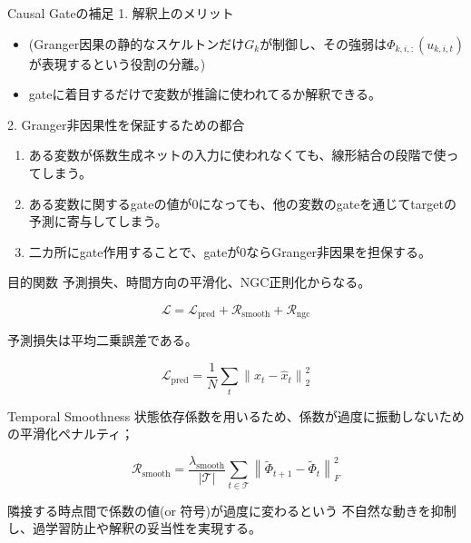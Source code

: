 \documentclass[dvipdfmx,11pt]{beamer}
\begin{document}
\begin{frame}{Causal Gateの補足}
1. 解釈上のメリット
\begin{itemize}
  \item (Granger因果の静的なスケルトンだけ$G_k$が制御し、その強弱は$\Phi_{k,i,:}(u_{k,i,t})$が表現するという役割の分離。)
  \item gateに着目するだけで変数が推論に使われてるか解釈できる。
\end{itemize}

2. Granger非因果性を保証するための都合
\begin{enumerate}
  \item ある変数が係数生成ネットの入力に使われなくても、線形結合の段階で使ってしまう。
  \item ある変数に関するgateの値が0になっても、他の変数のgateを通じてtargetの予測に寄与してしまう。
  \item 二カ所にgate作用することで、gateが0ならGranger非因果を担保する。
\end{enumerate}

\end{frame}




\begin{frame}{目的関数}
  予測損失、時間方向の平滑化、NGC正則化からなる。

  \[
    \mathcal{L}
    =
    \mathcal{L}_{\mathrm{pred}}
    +
    \mathcal{R}_{\mathrm{smooth}}
    +
    \mathcal{R}_{\mathrm{ngc}}
  \]

  \vspace{0.3em}

  予測損失は平均二乗誤差である。

  \[
    \mathcal{L}_{\mathrm{pred}}
    =
    \frac{1}{N}
    \sum_t
    \left\|
      x_t - \hat{x}_t
    \right\|_2^2
  \]

\end{frame}


\begin{frame}{Temporal Smoothness}
  状態依存係数を用いるため、係数が過度に振動しないための平滑化ペナルティ；

  \[
    \mathcal{R}_{\mathrm{smooth}}
    =
    \frac{\lambda_{\mathrm{smooth}}}{|\mathcal{T}|}
    \sum_{t \in \mathcal{T}}
    \left\|
      \tilde{\Phi}_{t+1}
      -
      \tilde{\Phi}_t
    \right\|_F^2
  \]

 隣接する時点間で係数の値(or 符号)が過度に変わるという
 不自然な動きを抑制し、過学習防止や解釈の妥当性を実現する。
\end{frame}
\end{document}

